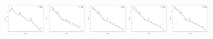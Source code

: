 \documentclass{beamer}
\begin{document}
\begin{frame}
\begin{figure}[htbp]
	\end{figure}
	\begin{figure}[htbp]
		\centering
			{\label{fig:subfig1}\includegraphics[width=0.15\textwidth]{figures/soh_cap/nasa_B0006_ar.jpg}}
			{\label{fig:subfig2}\includegraphics[width=0.15\textwidth]{figures/soh_cap/nasa_B0006_svr.jpg}}
			{\label{fig:subfig3}\includegraphics[width=0.15\textwidth]{figures/soh_cap/nasa_B0006_mlp.jpg}}
			{\label{fig:subfig4}\includegraphics[width=0.15\textwidth]{figures/soh_cap/nasa_B0006_lstm.jpg}}
			{\label{fig:subfig5}\includegraphics[width=0.15\textwidth]{figures/soh_cap/nasa_B0006_cnn.jpg}}
	\end{figure}
\end{frame}
\end{document}
